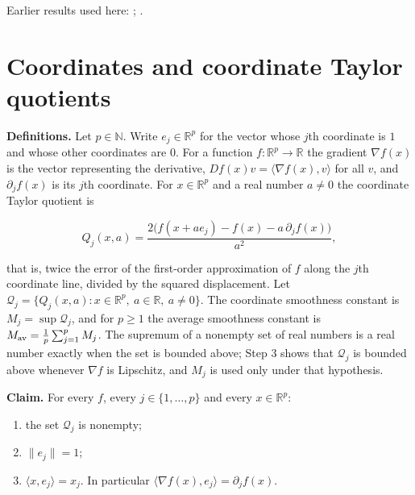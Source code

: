 \documentclass[11pt,a4paper]{article}
\begin{document}
Earlier results used here: \cite[Section~3.9]{LangevinLean2026ULASC}; \cite[Section~3.2]{LangevinLean2026ULASC}.

\section{\texorpdfstring{Coordinates and coordinate Taylor quotients}{Coordinates and coordinate Taylor quotients}}


\textbf{Definitions.} Let \(p\in\mathbb N\). Write \(e_j\in\mathbb R^p\) for the vector whose \(j\)th coordinate is \(1\) and whose other coordinates are \(0\). For a function \(f:\mathbb R^p\to\mathbb R\) the gradient \(\nabla f(x)\) is the vector representing the derivative, \(Df(x)v=\langle\nabla f(x),v\rangle\) for all \(v\), and \(\partial_jf(x)\) is its \(j\)th coordinate. For \(x\in\mathbb R^p\) and a real number \(a\ne0\) the coordinate Taylor quotient is


\[Q_j(x,a)=\frac{2\bigl(f(x+ae_j)-f(x)-a\,\partial_jf(x)\bigr)}{a^2},\]


that is, twice the error of the first-order approximation of \(f\) along the \(j\)th coordinate line, divided by the squared displacement. Let \(\mathcal Q_j=\{Q_j(x,a):x\in\mathbb R^p,\ a\in\mathbb R,\ a\ne0\}\). The coordinate smoothness constant is \(M_j=\sup\mathcal Q_j\), and for \(p\ge1\) the average smoothness constant is \(M_{\rm av}=\frac1p\sum_{j=1}^pM_j\). The supremum of a nonempty set of real numbers is a real number exactly when the set is bounded above; Step 3 shows that \(\mathcal Q_j\) is bounded above whenever \(\nabla f\) is Lipschitz, and \(M_j\) is used only under that hypothesis.




\textbf{Claim.} For every \(f\), every \(j\in\{1,\dots,p\}\) and every \(x\in\mathbb R^p\):



\begin{enumerate}


\item the set \(\mathcal Q_j\) is nonempty;

\item \(\|e_j\|=1\);

\item \(\langle x,e_j\rangle=x_j\). In particular \(\langle\nabla f(x),e_j\rangle=\partial_jf(x)\).

\end{enumerate}
\end{document}
